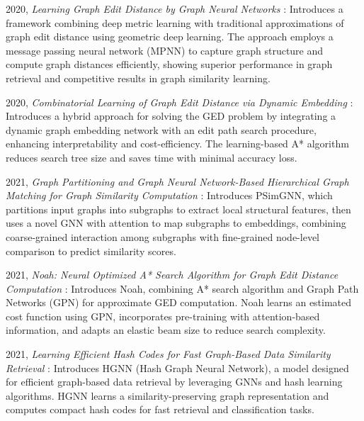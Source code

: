 \documentclass[../Thesis.tex]{subfiles}
\begin{document}
	2020, \textit{Learning Graph Edit Distance by Graph Neural Networks} \cite{learning_graph_edit_distance_by_graph_neural_networks}: Introduces a framework combining deep metric learning with traditional approximations of graph edit distance using geometric deep learning. The approach employs a message passing neural network (MPNN) to capture graph structure and compute graph distances efficiently, showing superior performance in graph retrieval and competitive results in graph similarity learning.
	
	2020, \textit{Combinatorial Learning of Graph Edit Distance via Dynamic Embedding} \cite{combinatorial_learning_of_graph_edit_distance_via_dynamic_embedding}: Introduces a hybrid approach for solving the GED problem by integrating a dynamic graph embedding network with an edit path search procedure, enhancing interpretability and cost-efficiency. The learning-based A* algorithm reduces search tree size and saves time with minimal accuracy loss.
	
	2021, \textit{Graph Partitioning and Graph Neural Network-Based Hierarchical Graph Matching for Graph Similarity Computation} \cite{graph_partitioning_and_graph_neural_network_based_hierarchical_graph_matching_for_graph_similarity_computation}: Introduces PSimGNN, which partitions input graphs into subgraphs to extract local structural features, then uses a novel GNN with attention to map subgraphs to embeddings, combining coarse-grained interaction among subgraphs with fine-grained node-level comparison to predict similarity scores.
	
	2021, \textit{Noah: Neural Optimized A* Search Algorithm for Graph Edit Distance Computation} \cite{noah__neural_optimized_a*_search_algorithm_for_graph_edit_distance_computation}: Introduces Noah, combining A* search algorithm and Graph Path Networks (GPN) for approximate GED computation. Noah learns an estimated cost function using GPN, incorporates pre-training with attention-based information, and adapts an elastic beam size to reduce search complexity.
	
	2021, \textit{Learning Efficient Hash Codes for Fast Graph-Based Data Similarity Retrieval} \cite{learning_efficient_hash_codes_for_fast_graph_based_data_similarity_retrieval}: Introduces HGNN (Hash Graph Neural Network), a model designed for efficient graph-based data retrieval by leveraging GNNs and hash learning algorithms. HGNN learns a similarity-preserving graph representation and computes compact hash codes for fast retrieval and classification tasks.
	
\end{document}
